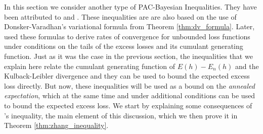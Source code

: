 \documentclass{uvamath}
\theoremstyle{remark}
\theoremstyle{definition}
\theoremstyle{definition}
\theoremstyle{definition}
\theoremstyle{definition}
\theoremstyle{definition}
\begin{document}
In this section we consider another type of PAC-Bayesian
Inequalities. They have been attributed to
\citet{zhang_e-entropy_2006} and
\citet{zhang_information-theoretic_2006}. These inequalities are are
also based on the use of Donsker-Varadhan's variational formula from
Theorem \ref{thm:dv_formula}. Later, \citet{grunwald_fast_2016} used
these formulas to derive rates of convergence for unbounded loss
functions under conditions on the tails of the excess losses and its
cumulant generating function. Just as it was the case in the previous
section, the inequalities that we explain here relate the cumulant
generating function of $E(h)-E_n(h)$ and the Kulback-Leibler
divergence and they can be used to bound the expected excess loss
directly. But now, these inequalities will be used as a bound on the
\textit{annealed expectation}, which at the same time and under
additional conditions can be used to bound the expected excess
loss. We start by explaining some consequences of
\citeauthor{zhang_information-theoretic_2006}'s inequality, the main
element of this discussion, which we then prove it in Theorem
\ref{thm:zhang_inequality}.
\end{document}
